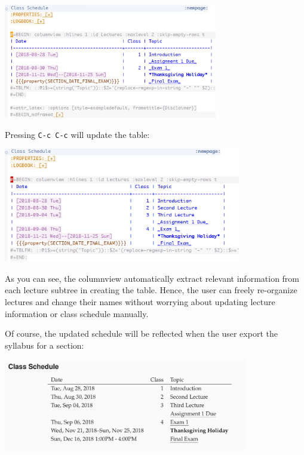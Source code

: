 \documentclass[10pt,article]{article}
\begin{document}
\begin{center}
\includegraphics[height=5cm]{../../../Assets/Images/Org-Teaching/Quickstart_Syllabus-Schedule-Old.png}
\end{center}

Pressing \texttt{C-c C-c} will update the table:

\begin{center}
\includegraphics[height=5cm]{../../../Assets/Images/Org-Teaching/Quickstart_Syllabus-Schedule-New.png}
\end{center}

As you can see, the columnview automatically extract relevant information from
each lecture subtree in creating the table. Hence, the user can freely
re-organize lectures and change their names without worrying about updating
lecture information or class schedule manually.

Of course, the updated schedule will be reflected when the user export the syllabus for a section:

\begin{center}
\includegraphics[height=4cm]{../../../Assets/Images/Org-Teaching/Quickstart_Syllabus-Exported-Schedule.png}
\end{center}
\end{document}
